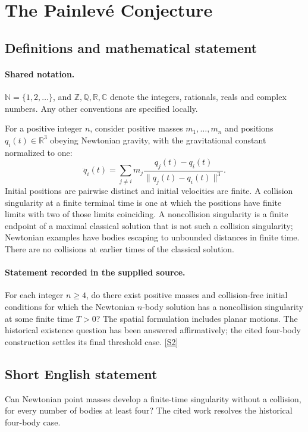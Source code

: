 \documentclass[11pt]{article}
\newcommand{\sref}[2]{\hyperlink{source:#1:#2}{[S#2]}}
\begin{document}
\section{The Painlevé Conjecture}\label{statement}

\subsection{Definitions and mathematical statement}

\paragraph{Shared notation.}$\mathbb N=\{1,2,\ldots\}$, and $\mathbb Z,\mathbb Q,\mathbb R,\mathbb C$ denote the integers, rationals, reals and complex numbers. Any other conventions are specified locally.


For a positive integer \(n\), consider positive masses
\(m_1,\ldots,m_n\) and positions \(q_i(t)\in\mathbb R^3\)
obeying Newtonian gravity, with the gravitational constant normalized to one:
\[
 \ddot q_i(t)=\sum_{j\ne i}m_j
      \frac{q_j(t)-q_i(t)}{\|q_j(t)-q_i(t)\|^3}.
\]
Initial positions are pairwise distinct and initial velocities are finite.
A collision singularity at a finite terminal time is one at which the
positions have finite limits with two of those limits coinciding.
A noncollision singularity is a finite endpoint of a maximal classical
solution that is not such a collision singularity; Newtonian examples
have bodies escaping to unbounded distances in finite time.
There are no collisions at earlier times of the classical solution.
\paragraph{Statement recorded in the supplied source.}
For each integer \(n\ge4\), do there exist positive masses and
collision-free initial conditions for which the Newtonian \(n\)-body
solution has a noncollision singularity at some finite time \(T>0\)?
The spatial formulation includes planar motions.
The historical existence question has been answered affirmatively;
the cited four-body construction settles its final threshold case. \sref{statement}{2}
\subsection{Short English statement}
Can Newtonian point masses develop a finite-time singularity without a collision, for every number of bodies at least four? The cited work resolves the historical four-body case.
\end{document}
